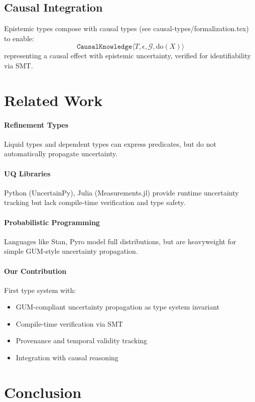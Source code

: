 \documentclass[11pt]{article}
\begin{document}
\subsection{Causal Integration}
Epistemic types compose with causal types (see causal-types/formalization.tex) to enable:
\[
\texttt{CausalKnowledge}\langle T, \epsilon, \mathcal{G}, \text{do}(X) \rangle
\]
representing a causal effect with epistemic uncertainty, verified for identifiability via SMT.

\section{Related Work}

\paragraph{Refinement Types} Liquid types and dependent types can express predicates, but do not automatically propagate uncertainty.

\paragraph{UQ Libraries} Python (UncertainPy), Julia (Measurements.jl) provide runtime uncertainty tracking but lack compile-time verification and type safety.

\paragraph{Probabilistic Programming} Languages like Stan, Pyro model full distributions, but are heavyweight for simple GUM-style uncertainty propagation.

\paragraph{Our Contribution} First type system with:
\begin{itemize}
\item GUM-compliant uncertainty propagation as type system invariant
\item Compile-time verification via SMT
\item Provenance and temporal validity tracking
\item Integration with causal reasoning
\end{itemize}

\section{Conclusion}
\end{document}
